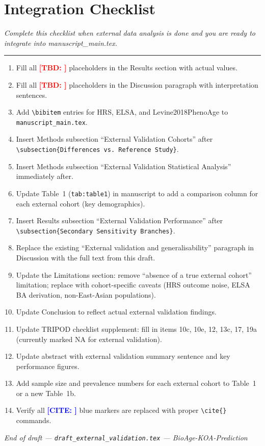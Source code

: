 \documentclass[11pt,a4paper]{article}
\newcommand{\TBD}[1]{\textcolor{red}{\textbf{[TBD: #1]}}}
\newcommand{\CITE}[1]{\textcolor{blue}{\textbf{[CITE: #1]}}}
\begin{document}
\section*{Integration Checklist}
\noindent\textit{Complete this checklist when external data analysis is done and you are ready to integrate into manuscript\_main.tex.}

\vspace{4pt}
\hrule
\vspace{8pt}

\begin{enumerate}
  \item[\(\square\)] Fill all \TBD{} placeholders in the Results section with actual values.
  \item[\(\square\)] Fill all \TBD{} placeholders in the Discussion paragraph with interpretation sentences.
  \item[\(\square\)] Add \texttt{\textbackslash bibitem} entries for HRS, ELSA, and Levine2018PhenoAge to \texttt{manuscript\_main.tex}.
  \item[\(\square\)] Insert Methods subsection ``External Validation Cohorts'' after \texttt{\textbackslash subsection\{Differences vs.\ Reference Study\}}.
  \item[\(\square\)] Insert Methods subsection ``External Validation Statistical Analysis'' immediately after.
  \item[\(\square\)] Update Table~1 (\texttt{tab:table1}) in manuscript to add a comparison column for each external cohort (key demographics).
  \item[\(\square\)] Insert Results subsection ``External Validation Performance'' after \texttt{\textbackslash subsection\{Secondary Sensitivity Branches\}}.
  \item[\(\square\)] Replace the existing ``External validation and generalisability'' paragraph in Discussion with the full text from this draft.
  \item[\(\square\)] Update the Limitations section: remove ``absence of a true external cohort'' limitation; replace with cohort-specific caveats (HRS outcome noise, ELSA BA derivation, non-East-Asian populations).
  \item[\(\square\)] Update Conclusion to reflect actual external validation findings.
  \item[\(\square\)] Update TRIPOD checklist supplement: fill in items 10c, 10e, 12, 13c, 17, 19a (currently marked NA for external validation).
  \item[\(\square\)] Update abstract with external validation summary sentence and key performance figures.
  \item[\(\square\)] Add sample size and prevalence numbers for each external cohort to Table~1 or a new Table~1b.
  \item[\(\square\)] Verify all \CITE{} blue markers are replaced with proper \texttt{\textbackslash cite\{\}} commands.
\end{enumerate}

\vspace{12pt}
\begin{center}
\textit{End of draft --- \texttt{draft\_external\_validation.tex} --- BioAge-KOA-Prediction}
\end{center}
\end{document}
